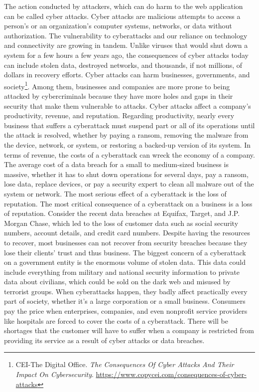 The action conducted by attackers, which can do harm to the web application can be called cyber attacks. Cyber attacks are malicious attempts to access a person's or an organization's computer systems, networks, or data without authorization. The vulnerability to cyberattacks and our reliance on technology and connectivity are growing in tandem. Unlike viruses that would shut down a system for a few hours a few years ago, the consequences of cyber attacks today can include stolen data, destroyed networks, and thousands, if not millions, of dollars in recovery efforts. Cyber attacks can harm businesses, governments, and society\footnote{CEI-The Digital Office. \textit{The Consequences Of Cyber Attacks And Their Impact On Cybersecurity}. \url{https://www.copycei.com/consequences-of-cyber-attacks}}. Among them, businesses and companies are more prone to being attacked by cybercriminals because they have more holes and gaps in their security that make them vulnerable to attacks. Cyber attacks affect a company's productivity, revenue, and reputation. Regarding productivity, nearly every business that suffers a cyberattack must suspend part or all of its operations until the attack is resolved, whether by paying a ransom, removing the malware from the device, network, or system, or restoring a backed-up version of its system. In terms of revenue, the costs of a cyberattack can wreck the economy of a company. The average cost of a data breach for a small to medium-sized business is massive, whether it has to shut down operations for several days, pay a ransom, lose data, replace devices, or pay a security expert to clean all malware out of the system or network. The most serious effect of a cyberattack is the loss of reputation. The most critical consequence of a cyberattack on a business is a loss of reputation. Consider the recent data breaches at Equifax, Target, and J.P. Morgan Chase, which led to the loss of customer data such as social security numbers, account details, and credit card numbers. Despite having the resources to recover, most businesses can not recover from security breaches because they lose their clients' trust and thus business. The biggest concern of a cyberattack on a government entity is the enormous volume of stolen data. This data could include everything from military and national security information to private data about civilians, which could be sold on the dark web and misused by terrorist groups. When cyberattacks happen, they badly affect practically every part of society, whether it's a large corporation or a small business. Consumers pay the price when enterprises, companies, and even nonprofit service providers like hospitals are forced to cover the costs of a cyberattack. There will be shortages that the customer will have to suffer when a company is restricted from providing its service as a result of cyber attacks or data breaches.


